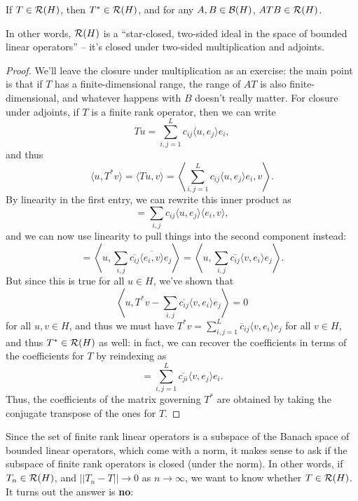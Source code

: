 \begin{theorem}
If $T \in \mathcal{R}(H)$, then $T^\ast \in \mathcal{R}(H)$, and for any $A, B \in \mathcal{B}(H)$, $ATB \in \mathcal{R}(H)$. 
\end{theorem}
 
In other words, $\mathcal{R}(H)$ is a ``star-closed, two-sided ideal in the space of bounded linear operators'' -- it's closed under two-sided multiplication and adjoints.

\begin{proof}
We'll leave the closure under multiplication as an exercise: the main point is that if $T$ has a finite-dimensional range, the range of $AT$ is also finite-dimensional, and whatever happens with $B$ doesn't really matter. For closure under adjoints, if $T$ is a finite rank operator, then we can write
\[
    Tu = \sum_{i,j=1}^L c_{ij} \langle u, e_j \rangle e_i,
\]
and thus 
\[
    \langle u, T^\ast v \rangle = \langle Tu, v \rangle = \left\langle \sum_{i,j=1}^L c_{ij} \langle u, e_j \rangle e_i, v \right\rangle.
\]
By linearity in the first entry, we can rewrite this inner product as 
\[
    = \sum_{i,j} c_{ij} \langle u, e_j \rangle \langle e_i, v \rangle,
\]
and we can now use linearity to pull things into the second component instead:
\[
    = \left\langle u, \sum_{i,j} \overline{c_{ij}} \overline{\langle e_i, v \rangle} e_j \right\rangle = \left\langle u, \sum_{i,j} \overline{c_{ij}} \langle v, e_i \rangle e_j \right\rangle.
\]
But since this is true for all $u \in H$, we've shown that 
\[
    \left\langle u, T^\ast v -  \sum_{i,j} \overline{c_{ij}} \langle v, e_i \rangle e_j \right\rangle = 0
\]
for all $u, v \in H$, and thus we must have $T^\ast v = \sum_{i,j=1}^{L} \overline{c}_{ij} \langle v, e_i \rangle e_j$ for all $v \in H$, and thus $T^\ast \in \mathcal{R}(H)$ as well: in fact, we can recover the coefficients in terms of the coefficients for $T$ by reindexing as 
\[
    = \sum_{i,j=1}^L \overline{c_{ji}} \langle v, e_j \rangle e_i.
\]
Thus, the coefficients of the matrix governing $T^\ast$ are obtained by taking the conjugate transpose of the ones for $T$.
\end{proof}

Since the set of finite rank linear operators is a subspace of the Banach space of bounded linear operators, which come with a norm, it makes sense to ask if the subspace of finite rank operators is closed (under the norm). In other words, if $T_n \in \mathcal{R}(H)$, and $||T_n - T|| \to 0$ as $n \to \infty$, we want to know whether $T \in \mathcal{R}(H)$. It turns out the answer is \textbf{no}:

